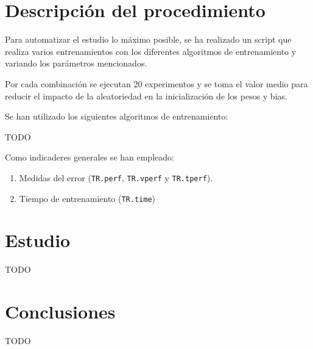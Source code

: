 \documentclass[a4paper,12pt,titlepage]{article}
\begin{document}
\section{Descripción del procedimiento}

Para automatizar el estudio lo máximo posible, se ha realizado un script que realiza varios entrenamientos con los diferentes algoritmos de entrenamiento y variando los parámetros mencionados. 

Por cada combinación se ejecutan 20 experimentos y se toma el valor medio para reducir el impacto de la aleatoriedad en la inicialización de los pesos y bias.

Se han utilizado los siguientes algoritmos de entrenamiento:

TODO

Como indicaderes generales se han empleado:

\begin{enumerate}[noitemsep]
	\item Medidas del error (\lstinline|TR.perf|, \lstinline|TR.vperf| y \lstinline|TR.tperf|).
	\item Tiempo de entrenamiento (\lstinline|TR.time|)
\end{enumerate}

\section{Estudio}

TODO

\section{Conclusiones}

TODO



\end{document}
